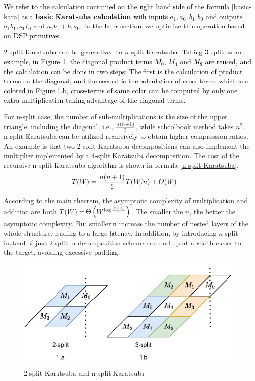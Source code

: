 \documentclass[conference]{IEEEtran}
\begin{document}
\textcolor{black}{
We refer to the calculation contained on the right hand side of the formula \ref{basic-kara} as a \textbf{basic Karatsuba calculation} with inputs $a_1, a_0, b_1, b_0$ and outputs $a_1b_1, a_0b_0$ and $a_1b_0 + b_1a_0$. In the later section, we optimize this operation based on DSP primitives.
}

\textcolor{black}{
$2$-split Karatsuba can be generalized to $n$-split Karatsuba. Taking $3$-split as an example, in Figure \ref{Figure1}, the diagonal product terms $M_0$, $M_4$ and $M_8$ are reused, and the calculation can be done in two steps: The first is the calculation of  product terms on the diagonal, and the second is the calculation of cross-terms which are colored in Figure \ref{Figure1}.b, cross-terms of same color can be computed by only one extra multiplication taking advantage of the diagonal terms. 
}

For n-split case, the number of sub-multiplications is the size of the upper triangle, including the diagonal, i.e., $n(n+1) \over 2$, while schoolbook method takes $n^2$. n-split Karatsuba can be utilized recursively to obtain higher compression ratios. An example is that two 2-split Karatsuba decompositions can also implement the multiplier implemented by a 4-split Karatsuba decomposition. The cost of the recursive n-split Karatsuba algorithm is shown in formula \ref{n-split Karatsuba}.
\begin{equation}
    \begin{split}
        T(W)&={n(n+1)\over 2} T(W/n)+O(W)
    \end{split} 
\label{n-split Karatsuba}
\end{equation}

According to the main theorem, the asymptotic complexity of multiplication and addition are both $T(W)=\Theta\left(W^{\log {(n+1)\over 2}}\right)$. The smaller the $n$, the better the asymptotic complexity. But smaller n increase the number of nested layers of the whole structure, leading to a large latency. In addition, by introducing $n$-split instead of just $2$-split, a decomposition scheme can end up at a width closer to the target, avoiding excessive padding.

\begin{figure}[htbp]   %
	\centering
	\includegraphics[width=\linewidth,scale=1.00]{fig1.pdf}    %
	\caption{2-split Karatsuba and n-split Karatsuba}
	\label{Figure1}
\end{figure}
\end{document}
